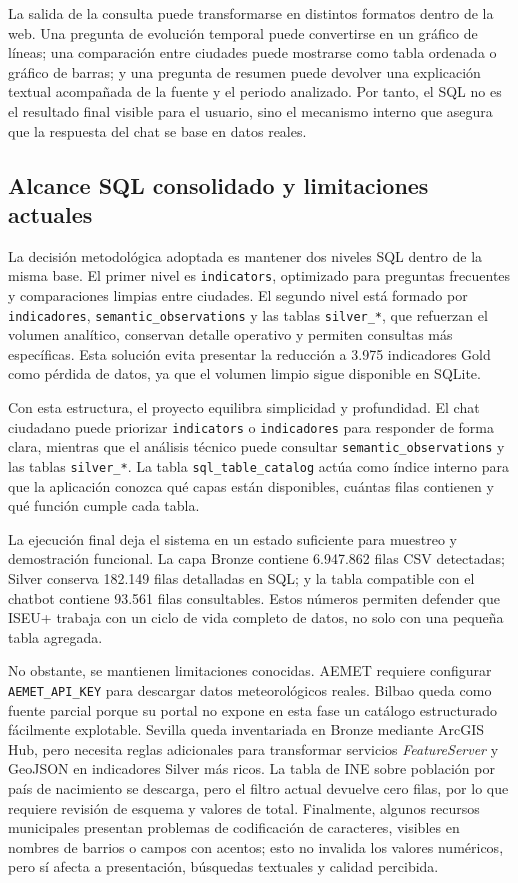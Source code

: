 La salida de la consulta puede transformarse en distintos formatos dentro de la web. Una pregunta de evolución temporal puede convertirse en un gráfico de líneas; una comparación entre ciudades puede mostrarse como tabla ordenada o gráfico de barras; y una pregunta de resumen puede devolver una explicación textual acompañada de la fuente y el periodo analizado. Por tanto, el SQL no es el resultado final visible para el usuario, sino el mecanismo interno que asegura que la respuesta del chat se base en datos reales.

\subsection{Alcance SQL consolidado y limitaciones actuales}

La decisión metodológica adoptada es mantener dos niveles SQL dentro de la misma base. El primer nivel es \texttt{indicators}, optimizado para preguntas frecuentes y comparaciones limpias entre ciudades. El segundo nivel está formado por \texttt{indicadores}, \texttt{semantic\_observations} y las tablas \texttt{silver\_*}, que refuerzan el volumen analítico, conservan detalle operativo y permiten consultas más específicas. Esta solución evita presentar la reducción a 3.975 indicadores Gold como pérdida de datos, ya que el volumen limpio sigue disponible en SQLite.

Con esta estructura, el proyecto equilibra simplicidad y profundidad. El chat ciudadano puede priorizar \texttt{indicators} o \texttt{indicadores} para responder de forma clara, mientras que el análisis técnico puede consultar \texttt{semantic\_observations} y las tablas \texttt{silver\_*}. La tabla \texttt{sql\_table\_catalog} actúa como índice interno para que la aplicación conozca qué capas están disponibles, cuántas filas contienen y qué función cumple cada tabla.

La ejecución final deja el sistema en un estado suficiente para muestreo y demostración funcional. La capa Bronze contiene 6.947.862 filas CSV detectadas; Silver conserva 182.149 filas detalladas en SQL; y la tabla compatible con el chatbot contiene 93.561 filas consultables. Estos números permiten defender que ISEU+ trabaja con un ciclo de vida completo de datos, no solo con una pequeña tabla agregada.

No obstante, se mantienen limitaciones conocidas. AEMET requiere configurar \texttt{AEMET\_API\_KEY} para descargar datos meteorológicos reales. Bilbao queda como fuente parcial porque su portal no expone en esta fase un catálogo estructurado fácilmente explotable. Sevilla queda inventariada en Bronze mediante ArcGIS Hub, pero necesita reglas adicionales para transformar servicios \textit{FeatureServer} y GeoJSON en indicadores Silver más ricos. La tabla de INE sobre población por país de nacimiento se descarga, pero el filtro actual devuelve cero filas, por lo que requiere revisión de esquema y valores de total. Finalmente, algunos recursos municipales presentan problemas de codificación de caracteres, visibles en nombres de barrios o campos con acentos; esto no invalida los valores numéricos, pero sí afecta a presentación, búsquedas textuales y calidad percibida.

